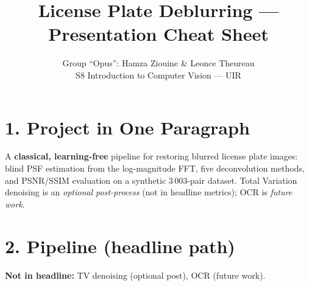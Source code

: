 \documentclass[10pt,a4paper]{article}
\title{\vspace{-2em}License Plate Deblurring --- Presentation Cheat Sheet}
\author{Group ``Opus'': Hamza Ziouine \& Leonce Theureau \\ S8 Introduction to Computer Vision --- UIR}
\date{}
\begin{document}
\maketitle
\vspace{-2.2em}

\section*{1. Project in One Paragraph}
A \textbf{classical, learning-free} pipeline for restoring blurred license
plate images: blind PSF estimation from the log-magnitude FFT, five
deconvolution methods, and PSNR/SSIM evaluation on a synthetic 3\,003-pair
dataset. Total Variation denoising is an \emph{optional post-process}
(not in headline metrics); OCR is \emph{future work}.

\section*{2. Pipeline (headline path)}
\begin{center}
\end{center}
\textbf{Not in headline:} TV denoising (optional post), OCR (future work).

\end{document}
